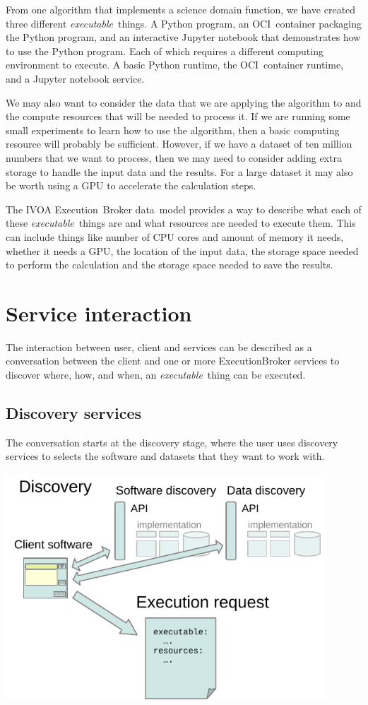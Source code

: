 \documentclass[11pt,a4paper]{ivoa}
\newcommand{\datamodel} {data~model}
\newcommand{\ivoa} {IVOA}
\newcommand{\execbrokerclass} {ExecutionBroker}
\newcommand{\executionbroker} {Execution~Broker}
\newcommand{\jupyternotebook} {Jupyter notebook}
\newcommand{\python} {Python}
\newcommand{\pythonprogram} {Python program}
\newcommand{\ocicontainer} {OCI~container}
\newcommand{\dataset} {dataset}
\newcommand{\executablething} {\textit{executable}~thing}
\newcommand{\cpu} {CPU}
\newcommand{\gpu} {GPU}
\begin{document}
From one algorithm that implements a science domain function, we have created three different \executablething{}s.
A \pythonprogram{}, an \ocicontainer{} packaging the \pythonprogram{}, and an interactive \jupyternotebook{}
that demonstrates how to use the \pythonprogram{}.
Each of which requires a different computing environment to execute.
A basic \python{} runtime, the \ocicontainer{} runtime, and a \jupyternotebook{} service.

We may also want to consider the data that we are applying the algorithm to and the compute resources that
will be needed to process it.
If we are running some small experiments to learn how to use the algorithm, then a basic computing
resource will probably be sufficient.
However, if we have a \dataset{} of ten million numbers that we want to process, then we may
need to consider adding extra storage to handle the input data and the results.
For a large \dataset{} it may also be worth using a \gpu{} to accelerate the calculation steps.

The \ivoa{} \executionbroker{} \datamodel{} provides a way to describe what each of these \executablething{}s
are and what resources are needed to execute them.
This can include things like number of \cpu{} cores and amount of memory it needs,
whether it needs a \gpu{}, the location of the input data, the storage space needed to perform
the calculation and the storage space needed to save the results.

\section{Service interaction}
\label{service-interaction}

The interaction between user, client and services can be described as a conversation between the client
and one or more \execbrokerclass{} services to discover where, how, and when, an \executablething{} can be
executed.

\subsection{Discovery services}
\label{discovery-services}

The conversation starts at the discovery stage, where the user uses discovery services to
selects the software and \dataset{}s that they want to work with.

\includegraphics[width=0.9\textwidth]{diagrams/data-discovery.pdf}
\end{document}
